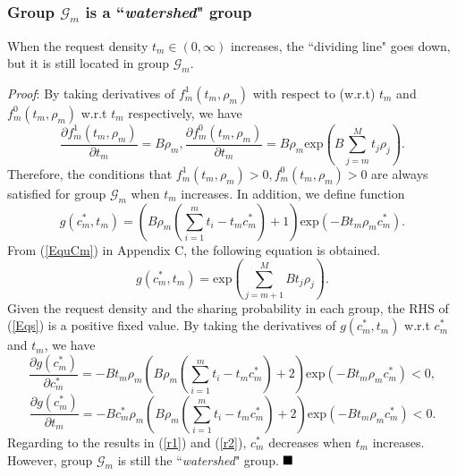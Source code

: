 \documentclass[12pt, draftclsnofoot, onecolumn]{IEEEtran}
\begin{document}
\subsubsection{Group $\mathcal{G}_{m}$ is a ``\textit{watershed}" group}
\begin{proposition}\label{Prop1}
When the request density $t_m \in (0, \infty)$ increases, the ``dividing line" goes down, but it is still located in group $\mathcal{G}_{m}$.
\end{proposition}
\textit{Proof}: By taking derivatives of $f^1_m(t_m, \rho_m)$ with respect to (w.r.t) $t_m$ and $f^0_m(t_m, \rho_m)$ w.r.t $t_m$ respectively, we have
\begin{equation}
\frac{\partial f^1_m(t_m, \rho_m) }{\partial t_m} = B\rho_m,
\frac{\partial f^0_m(t_m, \rho_m) }{\partial t_m} = B\rho_m\textrm{exp}\left(B\sum\limits_{j=m}^{M} t_j\rho_j\right).
\end{equation}
Therefore, the conditions that $ f^1_m(t_m, \rho_m)>0 ,f^0_m(t_m, \rho_m) >0$ are always satisfied for group $\mathcal{G}_{m}$ when $t_m$ increases.
In addition, we define function
\begin{equation} \label{gcm}
g(c_m^{\ast},t_m)=\left(B \rho_m\left({\sum\limits_{i=1}^{m}t_i}-t_m c_m^{\ast}\right) + 1\right) \textrm{exp}(-B t_m\rho_m c_m^{\ast}).
\end{equation}
From (\ref{EquCm}) in Appendix C, the following equation is obtained.
\begin{equation}\label{Eqs}
g(c_m^{\ast},t_m)= \textrm{exp}\left(\sum\limits_{j=m+1}^{M} B t_j \rho_j \right).
\end{equation}
Given the request density and the sharing probability in each group, the RHS of (\ref{Eqs}) is a positive fixed value.
By taking the derivatives of $g(c_m^{\ast},t_m)$ w.r.t $c_m^{\ast}$ and $t_m$, we have
\begin{equation}\label{r1}
\frac{\partial g(c_m^{\ast}) }{\partial c_m^{\ast}} = -B t_m\rho_m\left(B \rho_m\left({\sum\limits_{i=1}^{m}t_i}-t_m c_m^{\ast}\right) + 2\right) \textrm{exp}(-B t_m\rho_m c_m^{\ast}) < 0,
\end{equation}
\begin{equation}\label{r2}
\frac{\partial g(c_m^{\ast}) }{\partial t_m} = -B c_m^{\ast}\rho_m\left(B \rho_m\left({\sum\limits_{i=1}^{m}t_i}-t_m c_m^{\ast}\right) + 2\right) \textrm{exp}(-B t_m\rho_m c_m^{\ast})  < 0.
\end{equation}
Regarding to the results in (\ref{r1}) and (\ref{r2}), $c_m^{\ast}$ decreases when $t_m$ increases. However, group $\mathcal{G}_{m}$ is still the ``\textit{watershed}" group.
$\hfill\blacksquare$
\end{document}
